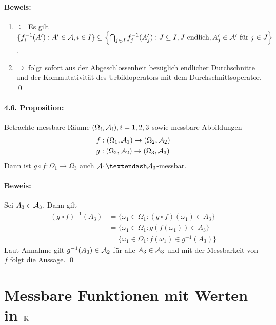 \documentclass[12pt]{report}
\begin{document}
 \paragraph{Beweis:}
 \begin{enumerate}[label=\Roman*.]
     \item $\subseteq$\newline
     Es gilt $\{f_i^{-1}(A'):A'\in\mathcal{A}, i\in I\}\subseteq\left\{\bigcap_{j\in J}f_j^{-1}(A_j'):J\subseteq I, J\text{ endlich},A_j'\in\mathcal{A}'\text{ f\"ur }j\in J\right\}$.
     \item $\supseteq$\newline
     folgt sofort aus der Abgeschlossenheit bez\"uglich endlicher Durchschnitte und der Kommutativit\"at des Urbildoperators mit dem Durchschnittsoperator. \qed
 \end{enumerate}
 
 \paragraph{4.6. Proposition:}Betrachte messbare R\"aume $(\Omega_i,\mathcal{A}_i),i=1,2,3$ sowie messbare Abbildungen 
 \begin{align*}
     &f:(\Omega_1,\mathcal{A}_1)\to(\Omega_2,\mathcal{A}_2)\\
     &g:(\Omega_2,\mathcal{A}_2)\to(\Omega_3,\mathcal{A}_3)
 \end{align*} 
 Dann ist $g\circ f:\Omega_1\to\Omega_3$ auch $\A_1\textendash\A_3$-messbar.
 
 \paragraph{Beweis:}Sei $A_3\in\mathcal{A}_3$. Dann gilt
 \begin{align*}
     (g\circ f)^{-1}(A_3)&=\{\omega_1\in\Omega_1:(g\circ f)(\omega_1)\in A_3\}\\
     &=\{\omega_1\in\Omega_1:g(f(\omega_1))\in A_3\}\\
     &=\{\omega_1\in\Omega_1:f(\omega_1)\in g^{-1}(A_3)\}
 \end{align*}
 Laut Annahme gilt $g^{-1}(A_3)\in\mathcal{A}_2$ f\"ur alle $A_3\in\mathcal{A}_3$ und mit der Messbarkeit von $f$ folgt die Aussage. \qed
 
 \section*{Messbare Funktionen mit Werten in $\mathbb{R}$}
 
\end{document}
